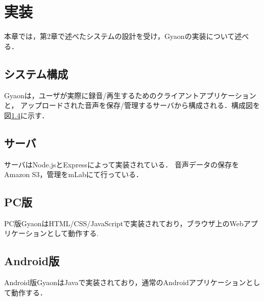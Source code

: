\chapter{実装}
\label{chap:implementation}

本章では，第2章で述べたシステムの設計を受け，Gyaonの実装について述べる．

\newpage

\section{システム構成}
Gyaonは，ユーザが実際に録音/再生するためのクライアントアプリケーションと，
アップロードされた音声を保存/管理するサーバから構成される．構成図を図\ref{}に示す．




\section{サーバ}
サーバはNode.jsとExpressによって実装されている．
音声データの保存をAmazon S3，管理をmLabにて行っている．

\section{PC版}
PC版GyaonはHTML/CSS/JavaScriptで実装されており，ブラウザ上のWebアプリケーションとして動作する.

\section{Android版}
Android版GyaonはJavaで実装されており，通常のAndroidアプリケーションとして動作する．

